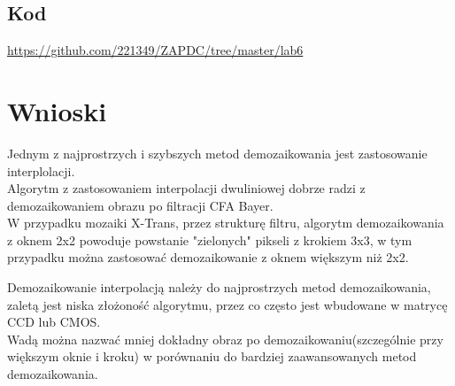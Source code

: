 \documentclass{article}
\begin{document}
\subsection{Kod}
\href{https://github.com/221349/ZAPDC/tree/master/lab6}{https://github.com/221349/ZAPDC/tree/master/lab6}

\section{Wnioski}
\par
Jednym z najprostrzych i szybszych metod demozaikowania jest zastosowanie interplolacji. \\
Algorytm z zastosowaniem interpolacji dwuliniowej dobrze radzi z demozaikowaniem obrazu po filtracji CFA Bayer. \\
W przypadku mozaiki X-Trans, przez strukturę filtru, algorytm demozaikowania z oknem 2x2 powoduje powstanie "zielonych" pikseli z krokiem 3x3, w tym przypadku można zastosować demozaikowanie z oknem większym niż 2x2.
\par 
Demozaikowanie interpolacją należy do najprostrzych metod demozaikowania, zaletą jest niska złożoność algorytmu, przez co często jest wbudowane w matrycę CCD lub CMOS. \\
Wadą można nazwać mniej dokładny obraz po demozaikowaniu(szczególnie przy większym oknie i kroku) w porównaniu do bardziej zaawansowanych metod demozaikowania.
\end{document}
